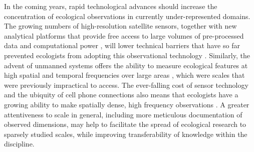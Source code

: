 \documentclass[12pt]{article}
\begin{document}
In the coming years, rapid technological advances should increase the concentration of ecological observations in currently under-represented domains. The growing numbers of high-resolution satellite sensors, together with new analytical platforms that provide free access to large volumes of pre-processed data and computational power \cite{googleearthengine}, will lower technical barriers that have so far prevented ecologists from adopting this observational technology  \cite{pettorelli_satellite_2014}. Similarly, the advent of unmanned systems offers the ability to measure ecological features at high spatial and temporal frequencies over large areas \cite{anderson_lightweight_2013}, which were scales that were previously impractical to access. The ever-falling cost of sensor technology and the ubiquity of cell phone connections also means that ecologists have a growing ability to make spatially dense, high frequency observations \cite{wolf_gsm-based_2012,collins_new_2006,porter_wireless_2005}. A greater attentiveness to scale in general, including more meticulous documentation of observed dimensions, may help to facilitate the spread of ecological research to sparsely studied scales, while improving transferability of knowledge within the discipline.  


\end{document}
